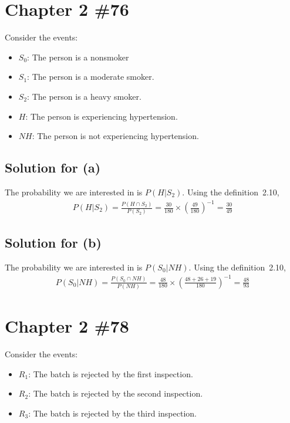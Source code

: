 \documentclass{scrartcl}
\begin{document}
\section{Chapter 2 \#76}
Consider the events:
\begin{itemize}
  \item \(S_0\): The person is a nonsmoker
  \item \(S_1\): The person is a moderate smoker.
  \item \(S_2\): The person is a heavy smoker.
  \item \(H\): The person is experiencing hypertension.
  \item \(NH\): The person is not experiencing hypertension.
\end{itemize}

\subsection{Solution for (a)}
The probability we are interested in is \(P(H | S_2)\). Using the
definition~2.10,
\begin{align*}
  P(H | S_2)
  = \frac{P(H \cap S_2)}{P(S_2)}
  = \frac{30}{180} \times \left( \frac{49}{180} \right)^{-1}
  = \frac{30}{49}
\end{align*}

\subsection{Solution for (b)}
The probability we are interested in is \(P(S_0 | NH)\). Using the
definition~2.10,
\begin{align*}
  P(S_0 | NH)
  = \frac{P(S_0 \cap NH)}{P(NH)}
  = \frac{48}{180} \times \left( \frac{48 + 26 + 19}{180} \right)^{-1}
  = \frac{48}{93}
\end{align*}

\section{Chapter 2 \#78}
Consider the events:
\begin{itemize}
  \item \(R_1\): The batch is rejected by the first inspection.
  \item \(R_2\): The batch is rejected by the second inspection.
  \item \(R_3\): The batch is rejected by the third inspection.
\end{itemize}
\end{document}
